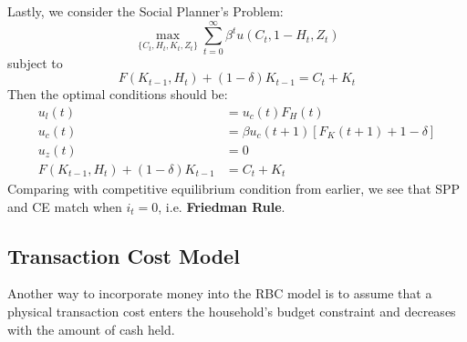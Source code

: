 \documentclass[12pt]{article}
\begin{document}
\noindent
Lastly, we consider the Social Planner's Problem:
\begin{equation}
	\max_{\{C_t, H_t, K_t, Z_t\}} \sum_{t=0}^\infty \beta^t u(C_t, 1-H_t, Z_t)
\end{equation}
subject to
\begin{equation}
	F(K_{t-1}, H_t) + (1-\delta)K_{t-1} = C_t + K_t
\end{equation}
Then the optimal conditions should be:
\begin{align}
	u_l(t) &= u_c(t)F_H(t)\\
	u_c(t) &= \beta u_c(t+1)[F_K(t+1) + 1 - \delta]\\
	u_z(t) &= 0\\
	F(K_{t-1}, H_t) + (1-\delta)K_{t-1} &= C_t + K_t
\end{align}
Comparing with competitive equilibrium condition from earlier, we see that SPP and CE match when $i_t = 0$, i.e. \textbf{Friedman Rule}.

\subsection{Transaction Cost Model}
Another way to incorporate money into the RBC model is to assume that a physical transaction cost enters the household's budget constraint and decreases with the amount of cash held.
\end{document}
